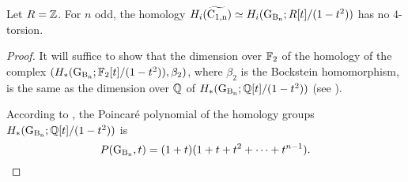 \begin{lem} \label{lem:no2tor2}
Let $R = \mathbb{Z}$. For $n$ odd, the homology $H_i(\widetilde{\operatorname{C_{1,n}}}) \simeq H_i(\operatorname{G_{B_{n}}}; R[t]/(1-t^2))$ has no $4$-torsion. 
\end{lem}
\begin{proof} 
It will suffice to show that the dimension over $\mathbb{F}_2$ of the homology of the complex $(H_*(\operatorname{G_{B_{n}}}; \mathbb{F}_2[t]/(1-t^2)), \beta_2)$, where $\beta_2$ is  the Bockstein homomorphism, is the same as the dimension over ${\mathbb{Q}}$ of $H_*(\operatorname{G_{B_{n}}}; {\mathbb{Q}}[t]/(1-t^2))$ (see \cite[Thm.~3E.4]{hatcher_at}).


According to \cite[Thm.~6.1, case $r=2$ and $n$ odd]{lehr04}, the Poincar\'e polynomial of the homology groups
$H_*(\operatorname{G_{B_{n}}}; {\mathbb{Q}}[t]/(1-t^2)) 
$
is
$$
P(\operatorname{G_{B_{n}}},t)= 
(1+t)(1+t+t^2+ \cdots + t^{n-1}). 
$$





\end{proof}
